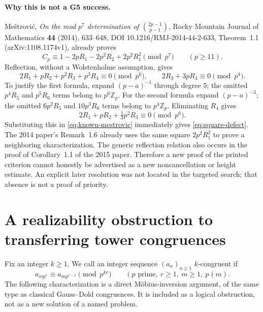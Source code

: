 \documentclass[11pt,a4paper]{article}
\theoremstyle{definition}
\theoremstyle{remark}
\begin{document}
\paragraph{Why this is not a G5 success.}
Me\v{s}trovi\'c, \emph{On the mod $p^7$ determination of
$\binom{2p-1}{p-1}$}, Rocky Mountain Journal of Mathematics
\textbf{44} (2014), 633--648,
DOI 10.1216/RMJ-2014-44-2-633, Theorem~1.1 \cite{Mestrovic2014p7}
(arXiv:1108.1174v1), already proves
\begin{equation}\label{eq:known-mestrovic}
 C_p\equiv1-2pR_1-2p^2R_2+2p^2R_1^2\pmod{p^7}
 \qquad(p\ge11).
\end{equation}
Reflection, without a Wolstenholme assumption, gives
\[
 2R_1+pR_2+p^2R_3+p^3R_4\equiv0\pmod{p^6},
 \qquad 2R_3+3pR_4\equiv0\pmod{p^4}.
\]
To justify the first formula, expand $(p-a)^{-1}$ through degree $5$;
the omitted $p^4R_5$ and $p^5R_6$ terms belong to $p^6\mathbb Z_p$.
For the second formula expand $(p-a)^{-3}$; the omitted
$6p^2R_5$ and $10p^3R_6$ terms belong to $p^4\mathbb Z_p$.
Eliminating $R_4$ gives
\[
 2R_1+pR_2+\tfrac13p^2R_3\equiv0\pmod{p^6}.
\]
Substituting this in \eqref{eq:known-mestrovic} immediately gives
\eqref{eq:square-defect}.  The 2014 paper's Remark~1.6 already uses
the same square $2p^2R_1^2$ to prove a neighboring characterization.
The generic reflection relation also occurs in the proof of Corollary~1.1
of the 2015 paper.  Therefore a new proof of the printed criterion
cannot honestly be advertised as a new noncancellation or height estimate.
An explicit later resolution was not located in the targeted search;
that absence is not a proof of priority.

\section{A realizability obstruction to transferring tower congruences}

Fix an integer $k\ge1$. We call an integer sequence $(a_n)_{n\ge1}$
$k$-congruent if
\[
 a_{mp^r}\equiv a_{mp^{r-1}}\pmod{p^{kr}}
 \qquad(p\text{ prime},\ r\ge1,\ m\ge1,\ p\nmid m).
\]
The following characterization is a direct M\"obius-inversion argument,
of the same type as classical Gauss--Dold congruences. It is included as
a logical obstruction, not as a new solution of a named problem.
\end{document}
